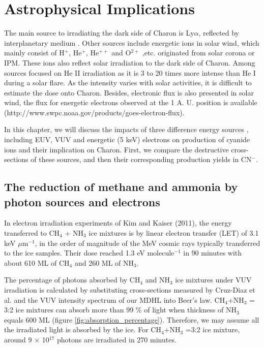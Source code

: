 \chapter{\protect Astrophysical Implications}
\label{astron}

The main source to irradiating the dark side of Charon is Ly$\alpha$, reflected by interplanetary medium \cite{grundy2016formation}. Other sources include energetic ions in solar wind, which mainly consist of H$^+$, He$^+$, He$^{++}$ and O$^{2+}$ ,etc. originated from solar corona or IPM. These ions also reflect solar irradiation to the dark side of Charon. Among sources focused on He II irradiation as it is 3 to 20 times more intense than He I during a solar flare. As the intensity varies with solar activities, it is difficult to estimate the dose onto Charon. Besides, electronic flux is also presented in solar wind, the flux for energetic electrons observed at the 1 A. U. position is available (http://www.swpc.noaa.gov/products/goes-electron-flux).

In this chapter, we will discuss the impacts of three difference energy sources , including EUV, VUV and energetic (5 keV) electrons on production of cyanide ions and their implication on Charon. First, we compare the destructive cross-sections of these sources, and then their corresponding production yields in CN$^-$. 
\section{The reduction of methane and ammonia by photon sources and electrons}

In electron irradiation experiments of Kim and Kaiser (2011)\cite{kim}, the energy transferred to CH$_4$ + NH$_3$ ice mixtures is by linear electron transfer (LET) of 3.1 keV $\mu$m$^{-1}$, in the order of magnitude of the MeV cosmic rays typically transferred to the ice samples. Their dose reached 1.3 eV molecule$^{-1}$ in 90 minutes with about 610 ML of CH$_4$ and 260 ML of NH$_3$. 

The percentage of photons absorbed by CH$_4$ and NH$_3$ ice mixtures under VUV irradiation is calculated by substituting cross-sections measured by Cruz-Diaz et al. \cite{cruz2014vacuum} and the VUV intensity spectrum of our MDHL into Beer$'$s law. CH$_4$+NH$_3$ = 3:2 ice mixtures can absorb more than 99 \% of light when thickness of NH$_3$ equals 600 ML (figure \ref{fig:absorption_percentage}). Therefore, we may assume all the irradiated light is absorbed by the ice. For CH$_4$+NH$_3$ =3:2 ice mixture, around 9 $\times$ 10$^{17}$ photons are irradiated in 270 minutes.


